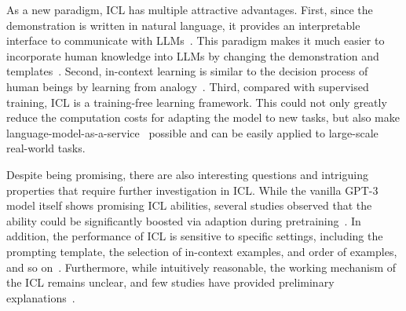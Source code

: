 
As a new paradigm, ICL has multiple attractive advantages. %
First, since the demonstration is written in natural language, it provides an interpretable interface to communicate with LLMs~\citep{gpt3}.
This paradigm makes it much easier to incorporate human knowledge into LLMs by changing the demonstration and templates~\citep{liu2022close,lu2022order,Wu2022SelfadaptiveIL,cot}. Second, in-context learning is similar to the decision process of human beings by learning from analogy~\citep{winston1980learningByAnalogy}. %
Third, compared with supervised training, ICL is a training-free learning framework. %
This could not only greatly reduce the computation costs for adapting the model to new tasks, but also make language-model-as-a-service~\citep{sun2022black} possible and can be easily applied to large-scale real-world tasks. %


Despite being promising, there are also interesting questions and intriguing properties that require further investigation in ICL.
While the vanilla GPT-3 model itself shows promising ICL abilities, several studies  observed that the ability could be significantly boosted via adaption during pretraining~\citep{metaicl,chen2022sensitivity}.
In addition, the performance of ICL is sensitive to specific settings, including the prompting template, the selection of in-context examples, and order of examples, and so on~\citep{calibrate}. Furthermore, while intuitively reasonable, the working mechanism of the ICL remains unclear, and few studies have provided preliminary explanations~\citep{dai2022iclft,icl_gd}.

